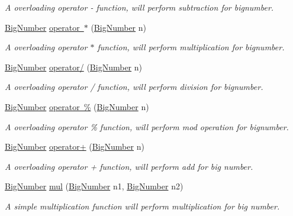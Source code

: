\begin{DoxyCompactItemize}
\begin{DoxyCompactList}\small\item\em A overloading operator -\/ function, will perform subtraction for bignumber. \end{DoxyCompactList}\item 
\mbox{\hyperlink{class_big_number}{Big\+Number}} \mbox{\hyperlink{class_big_number_ab4b64029ee9e3a27315ab11374a7bc6e}{operator $\ast$}} (\mbox{\hyperlink{class_big_number}{Big\+Number}} n)
\begin{DoxyCompactList}\small\item\em A overloading operator $\ast$ function, will perform multiplication for bignumber. \end{DoxyCompactList}\item 
\mbox{\hyperlink{class_big_number}{Big\+Number}} \mbox{\hyperlink{class_big_number_a7e1127c413ef2d8af1407d117b75e924}{operator/}} (\mbox{\hyperlink{class_big_number}{Big\+Number}} n)
\begin{DoxyCompactList}\small\item\em A overloading operator / function, will perform division for bignumber. \end{DoxyCompactList}\item 
\mbox{\hyperlink{class_big_number}{Big\+Number}} \mbox{\hyperlink{class_big_number_a19152e51454949e710abfa32d9ecdea4}{operator \%}} (\mbox{\hyperlink{class_big_number}{Big\+Number}} n)
\begin{DoxyCompactList}\small\item\em A overloading operator \% function, will perform mod operation for bignumber. \end{DoxyCompactList}\item 
\mbox{\hyperlink{class_big_number}{Big\+Number}} \mbox{\hyperlink{class_big_number_a3e43ae5ac8d42ee6f5056635e3935c57}{operator+}} (\mbox{\hyperlink{class_big_number}{Big\+Number}} n)
\begin{DoxyCompactList}\small\item\em A overloading operator + function, will perform add for big number. \end{DoxyCompactList}\item 
\mbox{\hyperlink{class_big_number}{Big\+Number}} \mbox{\hyperlink{class_big_number_aee00ad35f3dd644131f6a54aef4908ce}{mul}} (\mbox{\hyperlink{class_big_number}{Big\+Number}} n1, \mbox{\hyperlink{class_big_number}{Big\+Number}} n2)
\begin{DoxyCompactList}\small\item\em A simple multiplication function will perform multiplication for big number. \end{DoxyCompactList}\item 

\end{DoxyCompactItemize}
